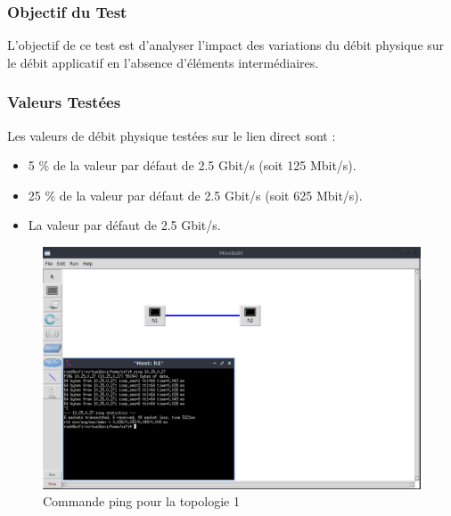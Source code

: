 \vspace{0.5cm}
\subsubsection{Objectif du Test}
L'objectif de ce test est d’analyser l’impact des variations du débit physique sur le débit applicatif en l’absence d’éléments intermédiaires.

\subsubsection{Valeurs Testées}
Les valeurs de débit physique testées sur le lien direct sont :
\begin{itemize}
    \item 5 \% de la valeur par défaut de 2.5 Gbit/s (soit 125 Mbit/s).
    \item 25 \% de la valeur par défaut de 2.5 Gbit/s (soit 625 Mbit/s).
    \item La valeur par défaut de 2.5 Gbit/s.
\end{itemize}
\begin{figure}[h]
    \centering
    \includegraphics[width=1\textwidth]{./images/T1.1/T1.1TopologyPing.png}
    \caption{Commande ping pour la topologie 1}
    \label{fig:exemple}
\end{figure}

